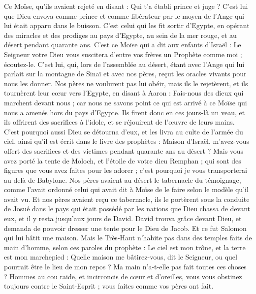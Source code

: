 \begin{multicols}{2}
Ce Moïse, qu’ils avaient rejeté en disant : Qui t'a établi prince et juge ? C’est lui que Dieu envoya comme prince et comme libérateur par le moyen de l'Ange qui lui était apparu dans le buisson.
C'est celui qui les fit sortir d’Egypte, en opérant des miracles et des prodiges au pays d’Egypte, au sein de la mer rouge, et au désert pendant quarante ans.
C'est ce Moïse qui a dit aux enfants d'Israël : Le Seigneur votre Dieu vous suscitera d'entre vos frères un Prophète comme moi ; écoutez-le.
C'est lui, qui, lors de l'assemblée au désert, étant avec l'Ange qui lui parlait sur la montagne de Sinaï et avec nos pères, reçut les oracles vivants pour nous les donner.
Nos pères ne voulurent pas lui obéir, mais ils le rejetèrent, et ils tournèrent leur cœur vers l’Egypte,
en disant à Aaron : Fais-nous des dieux qui marchent devant nous ; car nous ne savons point ce qui est arrivé à ce Moïse qui nous a amenés hors du pays d'Egypte.
Ils firent donc en ces jours-là un veau, et ils offrirent des sacrifices à l'idole, et se réjouirent de l’œuvre de leurs mains.
C'est pourquoi aussi Dieu se détourna d'eux, et les livra au culte de l'armée du ciel, ainsi qu'il est écrit dans le livre des prophètes : Maison d'Israël, m'avez-vous offert des sacrifices et des victimes pendant quarante ans au désert ?
Mais vous avez porté la tente de Moloch, et l'étoile de votre dieu Remphan ; qui sont des figures que vous avez faites pour les adorer ; c'est pourquoi je vous transporterai au-delà de Babylone.
Nos pères avaient au désert le tabernacle du témoignage, comme l’avait ordonné celui qui avait dit à Moïse de le faire selon le modèle qu'il avait vu.
Et nos pères avaient reçu ce tabernacle, ils le portèrent sous la conduite de Josué dans le pays qui était possédé par les nations que Dieu chassa de devant eux, et il y resta jusqu'aux jours de David.
David trouva grâce devant Dieu, et demanda de pouvoir dresser une tente pour le Dieu de Jacob.
Et ce fut Salomon qui lui bâtit une maison.
Mais le Très-Haut n'habite pas dans des temples faits de main d’homme, selon ces paroles du prophète :
Le ciel est mon trône, et la terre est mon marchepied : Quelle maison me bâtirez-vous, dit le Seigneur, ou quel pourrait être le lieu de mon repos ?
Ma main n'a-t-elle pas fait toutes ces choses ?
Hommes au cou raide, et incirconcis de cœur et d'oreilles, vous vous obstinez toujours contre le Saint-Esprit ; vous faites comme vos pères ont fait.

\end{multicols}
